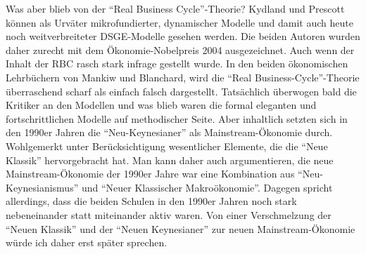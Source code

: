 Was aber blieb von der "`Real Business Cycle"'-Theorie? Kydland und Prescott können als Urväter mikrofundierter, dynamischer Modelle und damit auch heute noch weitverbreiteter DSGE-Modelle gesehen werden. Die beiden Autoren wurden daher zurecht mit dem Ökonomie-Nobelpreis 2004 ausgezeichnet.
Auch wenn der Inhalt der RBC rasch stark infrage gestellt wurde. In den beiden ökonomischen Lehrbüchern von Mankiw und Blanchard, wird die "`Real Business-Cycle"'-Theorie überraschend scharf als einfach falsch dargestellt. Tatsächlich überwogen bald die Kritiker an den Modellen und was blieb waren die formal eleganten und fortschrittlichen Modelle auf methodischer Seite. Aber inhaltlich setzten sich in den 1990er Jahren die "`Neu-Keynesianer"' als Mainstream-Ökonomie durch. Wohlgemerkt unter Berücksichtigung wesentlicher Elemente, die die "`Neue Klassik"' hervorgebracht hat. Man kann daher auch argumentieren, die neue Mainstream-Ökonomie der 1990er Jahre war eine Kombination aus "`Neu-Keynesianismus"' und "`Neuer Klassischer Makroökonomie"'. Dagegen spricht allerdings, dass die beiden Schulen in den 1990er Jahren noch stark nebeneinander statt miteinander aktiv waren.
Von einer Verschmelzung der "`Neuen Klassik"' und der "`Neuen Keynesianer"' zur neuen Mainstream-Ökonomie würde ich daher erst später sprechen.


